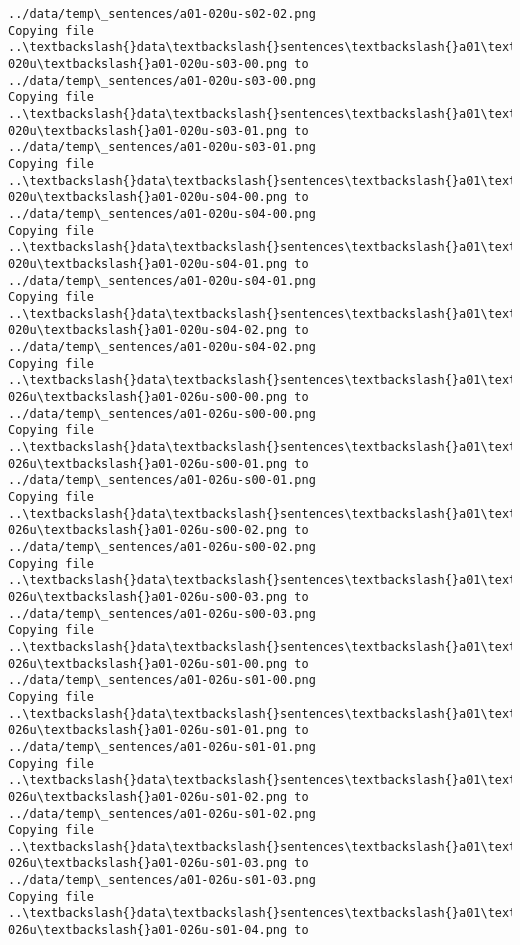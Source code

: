 \documentclass[11pt]{article}
\begin{document}
\begin{Verbatim}[commandchars=\\\{\}]
../data/temp\_sentences/a01-020u-s02-02.png
Copying file ..\textbackslash{}data\textbackslash{}sentences\textbackslash{}a01\textbackslash{}a01-020u\textbackslash{}a01-020u-s03-00.png to
../data/temp\_sentences/a01-020u-s03-00.png
Copying file ..\textbackslash{}data\textbackslash{}sentences\textbackslash{}a01\textbackslash{}a01-020u\textbackslash{}a01-020u-s03-01.png to
../data/temp\_sentences/a01-020u-s03-01.png
Copying file ..\textbackslash{}data\textbackslash{}sentences\textbackslash{}a01\textbackslash{}a01-020u\textbackslash{}a01-020u-s04-00.png to
../data/temp\_sentences/a01-020u-s04-00.png
Copying file ..\textbackslash{}data\textbackslash{}sentences\textbackslash{}a01\textbackslash{}a01-020u\textbackslash{}a01-020u-s04-01.png to
../data/temp\_sentences/a01-020u-s04-01.png
Copying file ..\textbackslash{}data\textbackslash{}sentences\textbackslash{}a01\textbackslash{}a01-020u\textbackslash{}a01-020u-s04-02.png to
../data/temp\_sentences/a01-020u-s04-02.png
Copying file ..\textbackslash{}data\textbackslash{}sentences\textbackslash{}a01\textbackslash{}a01-026u\textbackslash{}a01-026u-s00-00.png to
../data/temp\_sentences/a01-026u-s00-00.png
Copying file ..\textbackslash{}data\textbackslash{}sentences\textbackslash{}a01\textbackslash{}a01-026u\textbackslash{}a01-026u-s00-01.png to
../data/temp\_sentences/a01-026u-s00-01.png
Copying file ..\textbackslash{}data\textbackslash{}sentences\textbackslash{}a01\textbackslash{}a01-026u\textbackslash{}a01-026u-s00-02.png to
../data/temp\_sentences/a01-026u-s00-02.png
Copying file ..\textbackslash{}data\textbackslash{}sentences\textbackslash{}a01\textbackslash{}a01-026u\textbackslash{}a01-026u-s00-03.png to
../data/temp\_sentences/a01-026u-s00-03.png
Copying file ..\textbackslash{}data\textbackslash{}sentences\textbackslash{}a01\textbackslash{}a01-026u\textbackslash{}a01-026u-s01-00.png to
../data/temp\_sentences/a01-026u-s01-00.png
Copying file ..\textbackslash{}data\textbackslash{}sentences\textbackslash{}a01\textbackslash{}a01-026u\textbackslash{}a01-026u-s01-01.png to
../data/temp\_sentences/a01-026u-s01-01.png
Copying file ..\textbackslash{}data\textbackslash{}sentences\textbackslash{}a01\textbackslash{}a01-026u\textbackslash{}a01-026u-s01-02.png to
../data/temp\_sentences/a01-026u-s01-02.png
Copying file ..\textbackslash{}data\textbackslash{}sentences\textbackslash{}a01\textbackslash{}a01-026u\textbackslash{}a01-026u-s01-03.png to
../data/temp\_sentences/a01-026u-s01-03.png
Copying file ..\textbackslash{}data\textbackslash{}sentences\textbackslash{}a01\textbackslash{}a01-026u\textbackslash{}a01-026u-s01-04.png to

\end{Verbatim}
\end{document}
